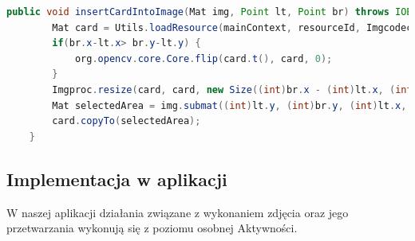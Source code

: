 \documentclass{article}
\numberwithin{equation}{section}
\begin{document}
\begin{lstlisting}[language=Java]
public void insertCardIntoImage(Mat img, Point lt, Point br) throws IOException {
        Mat card = Utils.loadResource(mainContext, resourceId, Imgcodecs.CV_LOAD_IMAGE_COLOR);
        if(br.x-lt.x> br.y-lt.y) {
            org.opencv.core.Core.flip(card.t(), card, 0);
        }
        Imgproc.resize(card, card, new Size((int)br.x - (int)lt.x, (int)br.y - (int)lt.y));
        Mat selectedArea = img.submat((int)lt.y, (int)br.y, (int)lt.x, (int)br.x);
        card.copyTo(selectedArea);
    }
\end{lstlisting}

\subsection{Implementacja w aplikacji}

W naszej aplikacji działania związane z wykonaniem zdjęcia oraz jego przetwarzania wykonują się z poziomu osobnej Aktywności.
\end{document}

